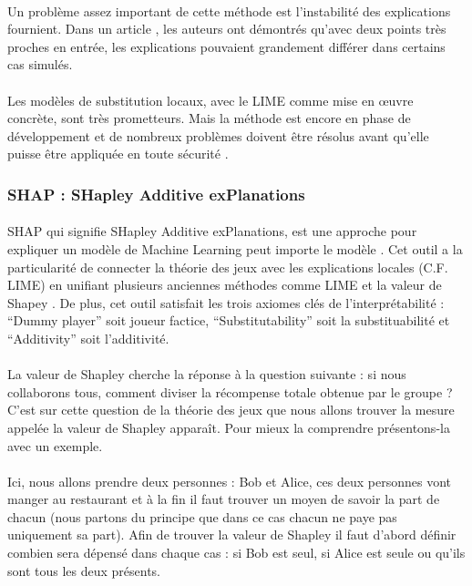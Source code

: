 \documentclass[10pt, french, a4paper]{report}
\begin{document}
\paragraph{}
Un problème assez important de cette méthode est l'instabilité des explications fournient. Dans un article \citep{alvarez_on_the_2018}, les auteurs ont démontrés qu'avec deux points très proches en entrée, les explications pouvaient grandement différer dans certains cas simulés. 

\paragraph{}
Les modèles de substitution locaux, avec le LIME comme mise en œuvre concrète, sont très prometteurs. Mais la méthode est encore en phase de développement et de nombreux problèmes doivent être résolus avant qu'elle puisse être appliquée en toute sécurité \citep{molnar2019}.

\subsubsection{SHAP : SHapley Additive exPlanations}
\label{subsec:shap}

\paragraph{}
SHAP qui signifie SHapley Additive exPlanations, est une approche pour expliquer un modèle de Machine Learning peut importe le modèle \citep{NIPS2017_7062}. Cet outil a la particularité de connecter la théorie des jeux avec les explications locales (C.F. LIME) en unifiant plusieurs anciennes méthodes comme LIME et la valeur de Shapey \citep{shapley_17._1953}. De plus, cet outil satisfait les trois axiomes clés de l’interprétabilité : ``Dummy player'' soit joueur factice, ``Substitutability'' soit la substituabilité et ``Additivity'' soit l’additivité.

\paragraph{}
La valeur de Shapley cherche la réponse à la question suivante : si nous collaborons tous, comment diviser la récompense totale obtenue par le groupe ? C’est sur cette question de la théorie des jeux que nous allons trouver la mesure appelée la valeur de Shapley apparaît. Pour mieux la comprendre présentons-la avec un exemple.

\paragraph{}
Ici, nous allons prendre deux personnes : Bob et Alice, ces deux personnes vont manger au restaurant et à la fin il faut trouver un moyen de savoir la part de chacun (nous partons du principe que dans ce cas chacun ne paye pas uniquement sa part). Afin de trouver la valeur de Shapley il faut d’abord définir combien sera dépensé dans chaque cas : si Bob est seul, si Alice est seule ou qu’ils sont tous les deux présents. 
\end{document}
